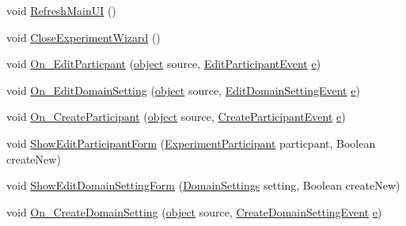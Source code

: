 \begin{DoxyCompactItemize}
\item 
void \hyperlink{class_web_analyzer_1_1_controller_1_1_main_controller_adaf2d5b304f6a713b9f08c9b4c7a6b62}{Refresh\+Main\+U\+I} ()
\item 
void \hyperlink{class_web_analyzer_1_1_controller_1_1_main_controller_ab0958418a7186810e84795d022411b19}{Close\+Experiment\+Wizard} ()
\item 
void \hyperlink{class_web_analyzer_1_1_controller_1_1_main_controller_aec177eebdda59cf460a762d1a10f0248}{On\+\_\+\+Edit\+Particpant} (\hyperlink{_u_i_2_h_t_m_l_resources_2js_2lib_2underscore_8min_8js_aae18b7515bb2bc4137586506e7c0c903}{object} source, \hyperlink{class_web_analyzer_1_1_events_1_1_edit_participant_event}{Edit\+Participant\+Event} \hyperlink{_u_i_2_h_t_m_l_resources_2js_2lib_2bootstrap_8min_8js_ab5902775854a8b8440bcd25e0fe1c120}{e})
\item 
void \hyperlink{class_web_analyzer_1_1_controller_1_1_main_controller_a42a7cdc67bd00b52cb7a8eb4f53e4262}{On\+\_\+\+Edit\+Domain\+Setting} (\hyperlink{_u_i_2_h_t_m_l_resources_2js_2lib_2underscore_8min_8js_aae18b7515bb2bc4137586506e7c0c903}{object} source, \hyperlink{class_web_analyzer_1_1_events_1_1_edit_domain_setting_event}{Edit\+Domain\+Setting\+Event} \hyperlink{_u_i_2_h_t_m_l_resources_2js_2lib_2bootstrap_8min_8js_ab5902775854a8b8440bcd25e0fe1c120}{e})
\item 
void \hyperlink{class_web_analyzer_1_1_controller_1_1_main_controller_a4937c92cdc2be045640d8a524ac1adb8}{On\+\_\+\+Create\+Participant} (\hyperlink{_u_i_2_h_t_m_l_resources_2js_2lib_2underscore_8min_8js_aae18b7515bb2bc4137586506e7c0c903}{object} source, \hyperlink{class_web_analyzer_1_1_events_1_1_create_participant_event}{Create\+Participant\+Event} \hyperlink{_u_i_2_h_t_m_l_resources_2js_2lib_2bootstrap_8min_8js_ab5902775854a8b8440bcd25e0fe1c120}{e})
\item 
void \hyperlink{class_web_analyzer_1_1_controller_1_1_main_controller_a1aec7be20aaeb09601a78b1568783ca9}{Show\+Edit\+Participant\+Form} (\hyperlink{class_web_analyzer_1_1_models_1_1_base_1_1_experiment_participant}{Experiment\+Participant} particpant, Boolean create\+New)
\item 
void \hyperlink{class_web_analyzer_1_1_controller_1_1_main_controller_a322327d4830f454e5841132b8dc99416}{Show\+Edit\+Domain\+Setting\+Form} (\hyperlink{class_web_analyzer_1_1_models_1_1_settings_model_1_1_domain_settings}{Domain\+Settings} setting, Boolean create\+New)
\item 
void \hyperlink{class_web_analyzer_1_1_controller_1_1_main_controller_aaec17c78ea87f6af50faa3fa08f5c551}{On\+\_\+\+Create\+Domain\+Setting} (\hyperlink{_u_i_2_h_t_m_l_resources_2js_2lib_2underscore_8min_8js_aae18b7515bb2bc4137586506e7c0c903}{object} source, \hyperlink{class_web_analyzer_1_1_events_1_1_create_domain_setting_event}{Create\+Domain\+Setting\+Event} \hyperlink{_u_i_2_h_t_m_l_resources_2js_2lib_2bootstrap_8min_8js_ab5902775854a8b8440bcd25e0fe1c120}{e})

\end{DoxyCompactItemize}
